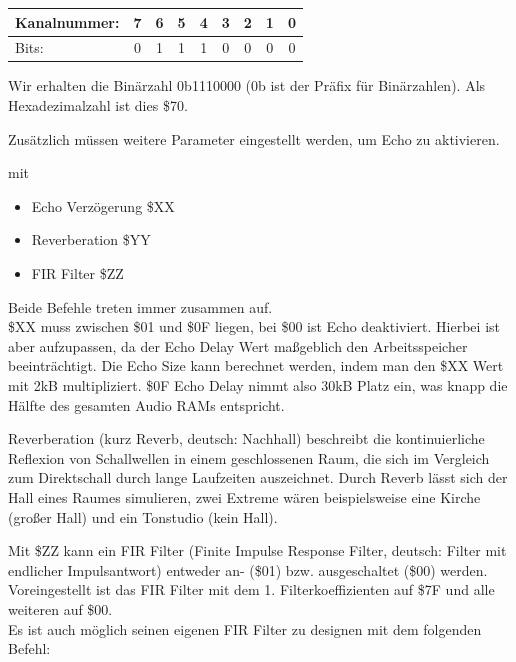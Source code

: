 \begin{table}[htbp]
	\centering
	\begin{tabularx}{8.5cm}{|X|c|c|c|c|c|c|c|c|}
		\hline
		Kanalnummer: & 7 & 6 & 5 & 4 & 3 & 2 & 1 & 0 \\
		\hline
		Bits: & 0 & 1 & 1 & 1 & 0 & 0 & 0 & 0 \\
		\hline
	\end{tabularx}
\end{table}


Wir erhalten die Binärzahl 0b1110000 (0b ist der Präfix für Binärzahlen). Als Hexadezimalzahl ist dies \$70.

\bigskip

Zusätzlich müssen weitere Parameter eingestellt werden, um Echo zu aktivieren.

\medskip



\medskip

mit

\begin{itemize}
	\item Echo Verzögerung \$XX
	\item Reverberation \$YY
	\item FIR Filter \$ZZ
\end{itemize}

Beide Befehle treten immer zusammen auf. \\

\$XX muss zwischen \$01 und \$0F liegen, bei \$00 ist Echo deaktiviert. Hierbei ist aber aufzupassen, da der Echo Delay Wert maßgeblich den Arbeitsspeicher beeinträchtigt. Die Echo Size kann berechnet werden, indem man den \$XX Wert mit 2kB multipliziert. \$0F Echo Delay nimmt also 30kB Platz ein, was knapp die Hälfte des gesamten Audio RAMs entspricht.

\bigskip

Reverberation (kurz Reverb, deutsch: Nachhall) beschreibt die kontinuierliche Reflexion von Schallwellen in einem geschlossenen Raum, die sich im Vergleich zum Direktschall durch lange Laufzeiten auszeichnet. Durch Reverb lässt sich der Hall eines Raumes simulieren, zwei Extreme wären beispielsweise eine Kirche (großer Hall) und ein Tonstudio (kein Hall).

\bigskip

Mit \$ZZ kann ein FIR Filter (Finite Impulse Response Filter, deutsch: Filter mit endlicher Impulsantwort) entweder an- (\$01) bzw. ausgeschaltet (\$00) werden. Voreingestellt ist das FIR Filter mit dem 1. Filterkoeffizienten auf \$7F und alle weiteren auf \$00. \\
Es ist auch möglich seinen eigenen FIR Filter zu designen mit dem folgenden Befehl:

